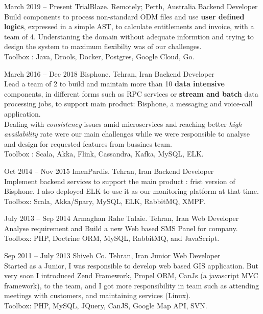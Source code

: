 \documentclass{tccv}
\begin{document}
\begin{eventlist}

\item{March 2019 -- Present}
  {TrialBlaze. Remotely; Perth, Australia}
  {Backend Developer}
  \\Build components to process non-standard ODM files and use \textbf{user defined logics}, expressed in a simple AST, to calculate entitlements and invoice, with a team of 4. Understaning the domain without adequate informtion and trying to design the system to maximum flexibilty was of our challenges.\\Toolbox : Java, Drools, Docker, Postgres, Google Cloud, Go.

\item{March 2016 -- Dec 2018}
  {Bisphone. Tehran, Iran}
  {Backend Developer}
  \\Lead a team of 2 to build and maintain more than 10 \textbf{data intensive} components, in different forms such as RPC services or \textbf{stream and batch} data processing jobs, to support main product: Bisphone, a messaging and voice-call application.\\Dealing with \textit{consistency} issues amid microservices and reaching better \textit{high availability} rate were our main challenges while we were responsible to analyse and design for requested features from bussines team.\\Toolbox : Scala, Akka, Flink, Cassandra, Kafka, MySQL, ELK.

\item{Oct 2014 -- Nov 2015}
  {ImenPardis. Tehran, Iran}
  {Backend Developer}
  \\Implement backend services to support the main product : frist version of Bisphone. I also deployed ELK to use it as our monitoring platform at that time.\\Toolbox: Scala, Akka/Spary, MySQL, ELK, RabbitMQ, XMPP.

\item{July 2013 -- Sep 2014}
  {Armaghan Rahe Talaie. Tehran, Iran}
  {Web Developer}
  \\Analyse requirement and Build a new Web based SMS Panel for company.\\Toolbox: PHP, Doctrine ORM, MySQL, RabbitMQ, and JavaScript.

\item{Sep 2011 -- July 2013}
  {Shiveh Co. Tehran, Iran}
  {Junior Web Developer}
  \\Started as a Junior, I was responsible to develop web based GIS application. But very soon I introduced Zend Framework, Propel ORM, CanJs (a javascript MVC framework), to the team, and I got more responsibility in team such as attending meetings with customers, and maintaining services (Linux).\\Toolbox: PHP, MySQL, JQuery, CanJS, Google Map API, SVN.

\end{eventlist}
\end{document}

